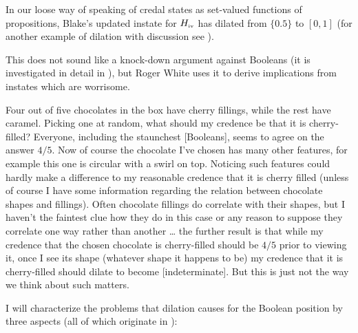 \documentclass[phd,12pt,oneside]{ubcthesis}
\begin{document}
{\noindent}In our loose way of speaking of credal states as set-valued functions
of propositions, Blake's updated instate for $H_{\mbox{\tiny{iv}}}$
has dilated from $\{0.5\}$ to $[0,1]$ (for another example of dilation
with discussion see ).

This does not sound like a knock-down argument against Booleans (it is
investigated in detail in ), but
Roger White uses it to derive implications from instates which are
worrisome.

\begin{quotex}
  \label{ex:chocolates} Four out of five
  chocolates in the box have cherry fillings, while the rest have
  caramel. Picking one at random, what should my credence be that it
  is cherry-filled? Everyone, including the staunchest [Booleans],
  seems to agree on the answer $4/5$. Now of course the chocolate I've
  chosen has many other features, for example this one is circular
  with a swirl on top. Noticing such features could hardly make a
  difference to my reasonable credence that it is cherry filled
  (unless of course I have some information regarding the relation
  between chocolate shapes and fillings). Often chocolate fillings do
  correlate with their shapes, but I haven't the faintest clue how
  they do in this case or any reason to suppose they correlate one way
  rather than another {\ldots} the further result is that while my
  credence that the chosen chocolate is cherry-filled should be $4/5$
  prior to viewing it, once I see its shape (whatever shape it happens
  to be) my credence that it is cherry-filled should dilate to become
  [indeterminate]. But this is just not the way we think about such
  matters. 
\end{quotex}

{\noindent}I will characterize the problems that dilation causes for the Boolean
position by three aspects (all of which originate in
):
\end{document}
